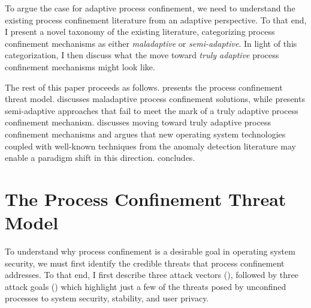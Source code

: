 \documentclass[dvipsnames, 12pt]{article}
\begin{document}
To argue the case for adaptive process confinement, we need to understand the
existing process confinement literature from an adaptive perspective. To that
end, I present a novel taxonomy of the existing literature, categorizing process
confinement mechanisms as either \textit{maladaptive} or \textit{semi-adaptive}.
In light of this categorization, I then discuss what the move toward
\textit{truly adaptive} process confinement mechanisms might look like.


The rest of this paper proceeds as follows.  presents the
process confinement threat model.
 discusses maladaptive process confinement solutions, while
 presents semi-adaptive approaches that fail to meet the
mark of a truly adaptive process confinement mechanism. 
discusses moving toward truly adaptive process confinement mechanisms and argues
that new operating system technologies coupled with well-known techniques from
the anomaly detection literature may enable a paradigm shift in this direction.
 concludes.

\section{The Process Confinement Threat Model}
\label{sec:threat_model}

To understand why process confinement is a desirable goal in operating system
security, we must first identify the credible threats that process confinement
addresses. To that end, I first describe three attack vectors
(), followed by three attack goals ()
which highlight just a few of the threats posed by unconfined processes to
system security, stability, and user privacy.
\end{document}
